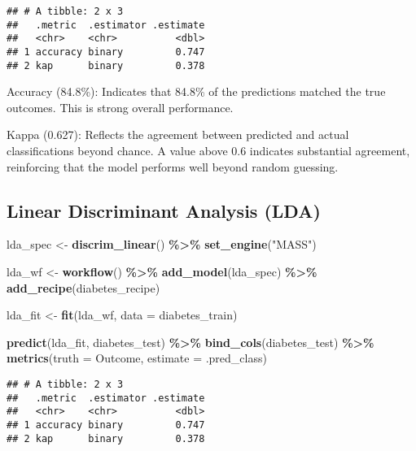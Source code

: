 \documentclass[
]{article}
\newenvironment{Shaded}{\begin{snugshade}}{\end{snugshade}}
\newcommand{\AttributeTok}[1]{\textcolor[rgb]{0.13,0.29,0.53}{#1}}
\newcommand{\FunctionTok}[1]{\textcolor[rgb]{0.13,0.29,0.53}{\textbf{#1}}}
\newcommand{\NormalTok}[1]{#1}
\newcommand{\OtherTok}[1]{\textcolor[rgb]{0.56,0.35,0.01}{#1}}
\newcommand{\SpecialCharTok}[1]{\textcolor[rgb]{0.81,0.36,0.00}{\textbf{#1}}}
\newcommand{\StringTok}[1]{\textcolor[rgb]{0.31,0.60,0.02}{#1}}
\begin{document}
\begin{verbatim}
## # A tibble: 2 x 3
##   .metric  .estimator .estimate
##   <chr>    <chr>          <dbl>
## 1 accuracy binary         0.747
## 2 kap      binary         0.378
\end{verbatim}

Accuracy (84.8\%): Indicates that 84.8\% of the predictions matched the
true outcomes. This is strong overall performance.

Kappa (0.627): Reflects the agreement between predicted and actual
classifications beyond chance. A value above 0.6 indicates substantial
agreement, reinforcing that the model performs well beyond random
guessing.

\subsection{Linear Discriminant Analysis
(LDA)}\label{linear-discriminant-analysis-lda}

\begin{Shaded}
\begin{Highlighting}[]
\NormalTok{lda\_spec }\OtherTok{\textless{}{-}} \FunctionTok{discrim\_linear}\NormalTok{() }\SpecialCharTok{\%\textgreater{}\%}
  \FunctionTok{set\_engine}\NormalTok{(}\StringTok{"MASS"}\NormalTok{)}

\NormalTok{lda\_wf }\OtherTok{\textless{}{-}} \FunctionTok{workflow}\NormalTok{() }\SpecialCharTok{\%\textgreater{}\%}
  \FunctionTok{add\_model}\NormalTok{(lda\_spec) }\SpecialCharTok{\%\textgreater{}\%}
  \FunctionTok{add\_recipe}\NormalTok{(diabetes\_recipe)}

\NormalTok{lda\_fit }\OtherTok{\textless{}{-}} \FunctionTok{fit}\NormalTok{(lda\_wf, }\AttributeTok{data =}\NormalTok{ diabetes\_train)}

\FunctionTok{predict}\NormalTok{(lda\_fit, diabetes\_test) }\SpecialCharTok{\%\textgreater{}\%}
  \FunctionTok{bind\_cols}\NormalTok{(diabetes\_test) }\SpecialCharTok{\%\textgreater{}\%}
  \FunctionTok{metrics}\NormalTok{(}\AttributeTok{truth =}\NormalTok{ Outcome, }\AttributeTok{estimate =}\NormalTok{ .pred\_class)}
\end{Highlighting}
\end{Shaded}

\begin{verbatim}
## # A tibble: 2 x 3
##   .metric  .estimator .estimate
##   <chr>    <chr>          <dbl>
## 1 accuracy binary         0.747
## 2 kap      binary         0.378
\end{verbatim}
\end{document}
